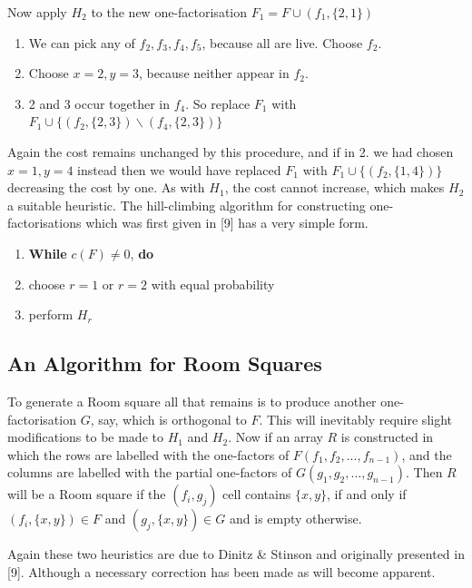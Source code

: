 \documentclass[
  12pt,
  a4paper]{book}
\begin{document}
Now apply \(H_2\) to the new one-factorisation
\(F_1=F \cup (f_1,\{2,1\})\)

\begin{enumerate}
\def\labelenumi{\arabic{enumi}.}
\item
  We can pick any of \(f_2, f_3, f_4, f_5\), because all are live.
  Choose \(f_2\).
\item
  Choose \(x=2, y=3\), because neither appear in \(f_2\).
\item
  2 and 3 occur together in \(f_4\). So replace \(F_1\) with
  \(F_1 \cup \{(f_2,\{2,3\}) \backslash (f_4,\{2,3\})\}\)
\end{enumerate}

Again the cost remains unchanged by this procedure, and if in 2. we had
chosen \(x=1,y=4\) instead then we would have replaced \(F_1\) with
\(F_1 \cup \{(f_2,\{1,4\})\}\) decreasing the cost by one. As with
\(H_1\), the cost cannot increase, which makes \(H_2\) a suitable
heuristic. The hill-climbing algorithm for constructing
one-factorisations which was first given in {[}9{]} has a very simple
form.

\begin{enumerate}
\def\labelenumi{\arabic{enumi}.}
\item
  \textbf{While} \(c(F) \neq 0\), \textbf{do}
\item
  choose \(r=1\) or \(r=2\) with equal probability
\item
  perform \(H_r\)
\end{enumerate}

\hypertarget{an-algorithm-for-room-squares}{%
\subsection{An Algorithm for Room
Squares}\label{an-algorithm-for-room-squares}}

To generate a Room square all that remains is to produce another
one-factorisation \(G\), say, which is orthogonal to \(F\). This will
inevitably require slight modifications to be made to \(H_1\) and
\(H_2\). Now if an array \(R\) is constructed in which the rows are
labelled with the one-factors of \(F(f_1,f_2,...,f_{n-1})\), and the
columns are labelled with the partial one-factors of
\(G(g_1,g_2,...,g_{n-1})\). Then \(R\) will be a Room square if the
\((f_i,g_j)\) cell contains \(\{x,y\}\), if and only if
\((f_i,\{x,y\}) \in F\) and \((g_j,\{x,y\}) \in G\) and is empty
otherwise.

Again these two heuristics are due to Dinitz \& Stinson and originally
presented in {[}9{]}. Although a necessary correction has been made as
will become apparent.
\end{document}
